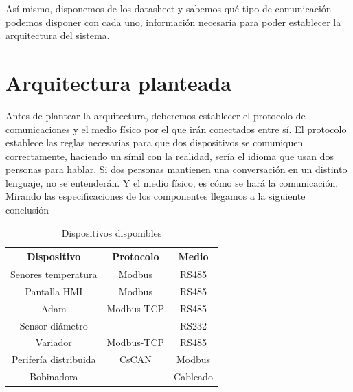 Así mismo, disponemos de los datasheet y sabemos qué tipo de comunicación podemos disponer con cada uno, información necesaria para poder establecer la arquitectura del sistema.

\section{Arquitectura planteada}
\label{arquitectura}

Antes de plantear la arquitectura, deberemos establecer el protocolo de comunicaciones y el medio físico por el que irán conectados entre sí. El protocolo establece las reglas necesarias para que dos dispositivos se comuniquen correctamente, haciendo un símil con la realidad, sería el idioma que usan dos personas para hablar. Si dos personas mantienen una conversación en un distinto lenguaje, no se entenderán. Y el medio físico, es cómo se hará la comunicación. Mirando las especificaciones de los componentes llegamos a la siguiente conclusión

\begin{table}[H]

\begin{tabular}{ccc}
\hline
{\bf Dispositivo}     & {\bf Protocolo} & {\bf Medio} \\ \hline
Senores temperatura   & Modbus          & RS485       \\
Pantalla HMI          & Modbus          & RS485       \\
Adam                  & Modbus-TCP      & RS485       \\
Sensor diámetro       & -               & RS232       \\
Variador              & Modbus-TCP      & RS485       \\
Perifería distribuida & CsCAN           & Modbus      \\
Bobinadora            &                 & Cableado    \\ \hline
\end{tabular}
\centering
\caption{Dispositivos disponibles}
\label{tab:dispositivos}
\end{table}


